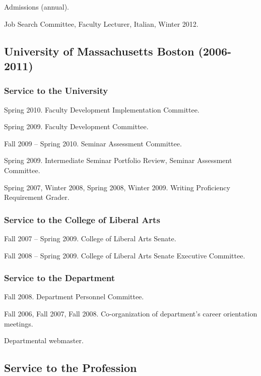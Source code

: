 \documentclass[11pt]{article}
\begin{document}
 Admissions (annual).

Job Search Committee, Faculty Lecturer, Italian, Winter 2012.


\subsection*{University of Massachusetts Boston (2006-2011)}

\subsubsection*{Service to the University}

Spring 2010. Faculty Development Implementation Committee.

Spring 2009. Faculty Development Committee.

Fall 2009 -- Spring 2010. Seminar Assessment Committee.

Spring 2009. Intermediate Seminar Portfolio Review, Seminar Assessment Committee.

Spring 2007, Winter 2008, Spring 2008, Winter 2009. Writing Proficiency Requirement Grader.


\subsubsection*{Service to the College of Liberal Arts}

Fall 2007 -- Spring 2009. College of Liberal Arts Senate.

Fall 2008 -- Spring 2009. College of Liberal Arts Senate Executive Committee.

\subsubsection*{Service to the Department}

Fall 2008.  Department Personnel Committee.

Fall 2006, Fall 2007, Fall 2008. Co-organization of department's
career orientation meetings.

Departmental webmaster.

\subsection*{Service to the Profession}
\end{document}
